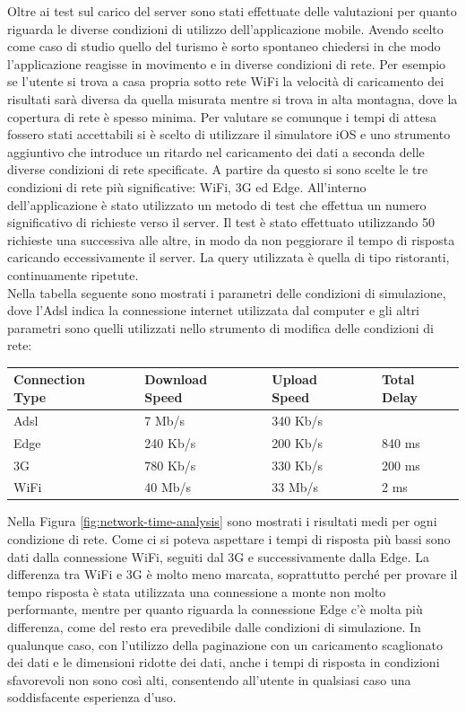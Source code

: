 Oltre ai test sul carico del server sono stati effettuate delle valutazioni per quanto riguarda le diverse condizioni di utilizzo dell'applicazione mobile. Avendo scelto come caso di studio quello del turismo è sorto spontaneo chiedersi in che modo l'applicazione reagisse in movimento e in diverse condizioni di rete. Per esempio se l'utente si trova a casa propria sotto rete WiFi la velocità di caricamento dei risultati sarà diversa da quella misurata mentre si trova in alta montagna, dove la copertura di rete è spesso minima. Per valutare se comunque i tempi di attesa fossero stati accettabili si è scelto di utilizzare il simulatore iOS e uno strumento aggiuntivo che introduce un ritardo nel caricamento dei dati a seconda delle diverse condizioni di rete specificate. A partire da questo si sono scelte le tre condizioni di rete più significative: WiFi, 3G ed Edge.
All'interno dell'applicazione è stato utilizzato un metodo di test che effettua un numero significativo di richieste verso il server. Il test è stato effettuato utilizzando 50 richieste una successiva alle altre, in modo da non peggiorare il tempo di risposta caricando eccessivamente il server. La query utilizzata è quella di tipo ristoranti, continuamente ripetute. \\
Nella tabella seguente sono mostrati i parametri delle condizioni di simulazione, dove l'Adsl indica la connessione internet utilizzata dal computer e gli altri parametri sono quelli utilizzati nello strumento di modifica delle condizioni di rete:
\begin{center}
	\begin{tabular}{ l l l l l  l l}
		Connection Type && Download Speed  && Upload Speed && Total Delay \\ \hline
		Adsl && 7 Mb/s && 340 Kb/s &&\\ \hline
		Edge && 240 Kb/s && 200 Kb/s && 840 ms \\ 
		3G  && 780 Kb/s && 330 Kb/s && 200 ms \\
		WiFi  && 40 Mb/s && 33 Mb/s && 2 ms \\
	\end{tabular}
\end{center}

Nella Figura \ref{fig:network-time-analysis} sono mostrati i risultati medi per ogni condizione di rete. Come ci si poteva aspettare i tempi di risposta più bassi sono dati dalla connessione WiFi, seguiti dal 3G e successivamente dalla Edge. La differenza tra WiFi e 3G è molto meno marcata, soprattutto perché per provare il tempo risposta è stata utilizzata una connessione a monte non molto performante, mentre per quanto riguarda la connessione Edge c'è molta più differenza, come del resto era prevedibile dalle condizioni di simulazione. In qualunque caso, con l'utilizzo della paginazione con un caricamento scaglionato dei dati e le dimensioni ridotte dei dati, anche i tempi di risposta in condizioni sfavorevoli non sono così alti, consentendo all'utente in qualsiasi caso una soddisfacente esperienza d'uso.

